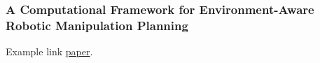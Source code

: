 
\subsubsection{A Computational Framework for Environment-Aware Robotic Manipulation Planning}

Example link \href{./attachedPapers/ComputationalFrameworkEnvAwareRobManipPlanning.pdf}{paper}. 